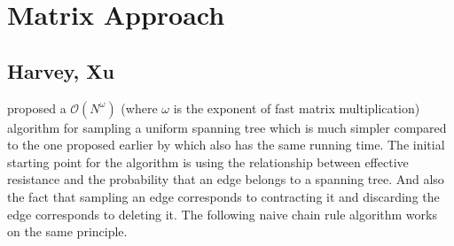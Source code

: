 

\newcommand{\laplacian}[1][G]{\ensuremath{L_{#1}^{+}}}
\newcommand{\reffformula}[1][\laplacian]{\ensuremath{ (\chi_u - \chi_v)^T \  #1 \ (\chi_u - \chi_v) }}

\newcommand{\proj}{\ensuremath{I - \frac{\textbf{1} \textbf{1}^T}{n}}}
\newcommand{\sqlaplacian}[1][G]{\ensuremath{\sqrt{L_{#1}^{+}}}}

\newcommand\norm[1]{\left\lVert#1\right\rVert}
%  
\newcommand{\comment}[1]{}

\newcommand{\Lim}[1]{\raisebox{0.5ex}{\scalebox{0.8}{$\displaystyle \lim_{#1}\;$}}}

\chapter{Matrix Approach} %

\label{Chapter4} %


\section{Harvey, Xu}

\citet{harvey2016generating} proposed a $\mathcal{O}(N^\omega)$ (where $\omega$ is the exponent of fast matrix multiplication) algorithm for sampling a uniform spanning tree which is much simpler compared to the one proposed earlier by \citet{COLBOURN1996268} which also has the same running time. The initial starting point for the algorithm is using the relationship between effective resistance and the probability that an edge belongs to a spanning tree. And also the fact that sampling an edge corresponds to contracting it and discarding the edge corresponds to deleting it. The following naive chain rule algorithm works on the same principle. 

